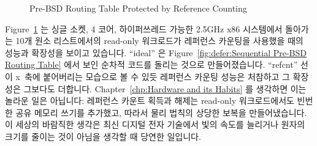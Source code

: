 \begin{figure}[tb]
\centering
{}
\caption{Pre-BSD Routing Table Protected by Reference Counting}
\label{fig:defer:Pre-BSD Routing Table Protected by Reference Counting}
\end{figure}

Figure~\ref{fig:defer:Pre-BSD Routing Table Protected by Reference Counting}
는 싱글 소켓, 4 코어, 하이퍼쓰레드 가능한 2.5GHz x86 시스템에서 돌아가는 10개
원소 리스트에서의 read-only 워크로드가 레퍼런스 카운팅을 사용했을 때의 성능과
확장성을 보이고 있습니다.
``ideal'' 은
Figure~\ref{fig:defer:Sequential Pre-BSD Routing Table} 에서 보인 순차적 코드를
돌리는 것으로 만들어졌습니다.
``refcnt'' 선이 x~축에 붙어버리는 모습으로 볼 수 있듯 레퍼런스 카운팅 성능은
처참하고 그 확장성은 그보다도 더합니다.
Chapter~\ref{chp:Hardware and its Habits} 를 생각하면 이는 놀라운 일은
아닙니다:
레퍼런스 카운트 획득과 해제는 read-only 워크로드에서도 빈번한 공유 메모리
쓰기를 추가했고, 따라서 물리 법칙의 상당한 보복을 만들어냈습니다.
이 세상의 바람직한 생각은 최신 디지털 전자 기술에서 빛의 속도를 늘리거나 원자의
크기를 줄이는 것이 아님을 생각할 때 당연한 일입니다.

